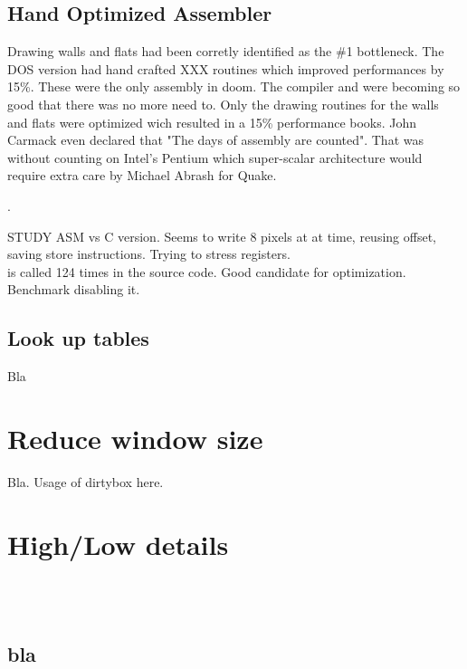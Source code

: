 \subsection{Hand Optimized Assembler}
Drawing walls and flats had been corretly identified as the \#1 bottleneck. The DOS version had hand crafted XXX routines which improved performances by 15\%. These were the only assembly in doom. The compiler and  were becoming so good that there was no more need to. Only the drawing routines for the walls and flats were optimized wich resulted in a 15\% performance books. John Carmack even declared that "The days of assembly are counted". That was without counting on Intel's Pentium which super-scalar architecture would require extra care by Michael Abrash for Quake.\\
\par
 .
 \par
 STUDY ASM vs C version. Seems to write 8 pixels at at time, reusing offset, saving store instructions. Trying to stress registers.\\
  is called 124 times in the source code. Good candidate for optimization. Benchmark disabling it.
 \par

\subsection{Look up tables}
Bla
\section{Reduce window size}
Bla. Usage of dirtybox here.
\par
{}
\par
\section{High/Low details}

\\
\\


\subsection{bla}
\par

